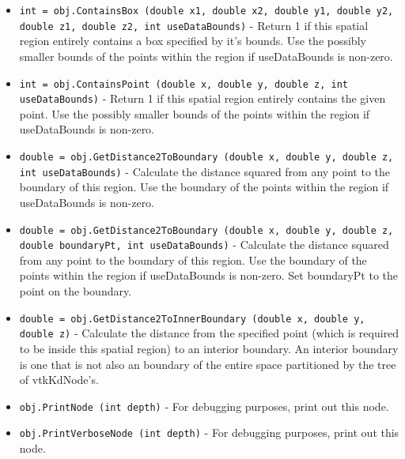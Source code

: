 \begin{itemize}
\item  \verb|int = obj.ContainsBox (double x1, double x2, double y1, double y2, double z1, double z2, int useDataBounds)| -    Return 1 if this spatial region entirely contains a box specified
   by it's bounds. Use the possibly smaller 
   bounds of the points within the region if useDataBounds is non-zero.

\item  \verb|int = obj.ContainsPoint (double x, double y, double z, int useDataBounds)| -    Return 1 if this spatial region entirely contains the given point.
   Use the possibly smaller bounds of the points within the region 
   if useDataBounds is non-zero.

\item  \verb|double = obj.GetDistance2ToBoundary (double x, double y, double z, int useDataBounds)| -    Calculate the distance squared from any point to the boundary of this
   region.  Use the boundary of the points within the region if useDataBounds
   is non-zero.

\item  \verb|double = obj.GetDistance2ToBoundary (double x, double y, double z, double boundaryPt, int useDataBounds)| -    Calculate the distance squared from any point to the boundary of this
   region.  Use the boundary of the points within the region if useDataBounds
   is non-zero.  Set boundaryPt to the point on the boundary.

\item  \verb|double = obj.GetDistance2ToInnerBoundary (double x, double y, double z)| -    Calculate the distance from the specified point (which is required to
   be inside this spatial region) to an interior boundary.  An interior
   boundary is one that is not also an boundary of the entire space
   partitioned by the tree of vtkKdNode's.

\item  \verb|obj.PrintNode (int depth)| -    For debugging purposes, print out this node.

\item  \verb|obj.PrintVerboseNode (int depth)| -    For debugging purposes, print out this node.

\end{itemize}
